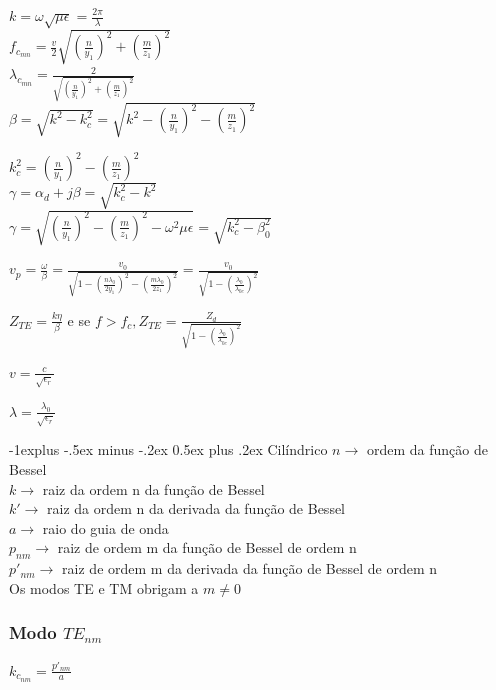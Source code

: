 \documentclass[10pt,landscape]{article}
\makeatletter
\renewcommand{\subsection}{\@startsection{subsection}{2}{0mm}%
                                {-1explus -.5ex minus -.2ex}%
                                {0.5ex plus .2ex}%
                                {\normalfont\normalsize\bfseries}}
\makeatother
\begin{document}
\begin{multicols}{4}
$k = \omega \sqrt{\mu\epsilon} = \frac{2 \pi}{\lambda}$ \\
$f_{c_{mn}} = \frac{v}{2} \sqrt{\left(\frac{n}{y_1}\right)^2 + \left(\frac{m}{z_1}\right)^2}$ \\
$\lambda_{c_{mn}} = \frac{2}{\sqrt{\left(\frac{n}{y_1}\right)^2 + \left(\frac{m}{z_1}\right)^2}}$ \\

$\beta = \sqrt{k^2 - k_c^2} = \sqrt{k^2 - \left(\frac{n}{y_1}\right)^2 - \left(\frac{m}{z_1}\right)^2}$ 

$k_c^2 = \left(\frac{n}{y_1}\right)^2 - \left(\frac{m}{z_1}\right)^2$\\

$\gamma = \alpha_d + j\beta = \sqrt{k_c^2 - k^2}$ \\

$\gamma = \sqrt{\left(\frac{n}{y_1}\right)^2 - \left(\frac{m}{z_1}\right)^2 - \omega^2\mu\epsilon} = \sqrt{k_c^2 - \beta_0^2}$ 

$v_p = \frac{\omega}{\beta} = \frac{v_0}{\sqrt{1 - \left(\frac{n\lambda_0}{2y_1}\right)^2 - \left(\frac{m\lambda_0}{2z_1}\right)^2 }} = \frac{v_0}{\sqrt{1 - \left(\frac{\lambda_0}{\lambda_{0c}}\right)^2}}$ 

$Z_{TE} = \frac{k\eta}{\beta}$ 
e se $f > f_c, Z_{TE} = \frac{Z_d}{\sqrt{1 - \left(\frac{\lambda_0}{\lambda_{0c}}\right)^2}} $

$v = \frac{c}{\sqrt{\epsilon_r}}$

$\lambda = \frac{\lambda_0}{\sqrt{\epsilon_r}}$

\subsection{Cilíndrico}
$n \rightarrow$ ordem da função de Bessel \\
$k \rightarrow$ raiz da ordem n da função de Bessel \\
$k' \rightarrow$ raiz da ordem n da derivada da função de Bessel \\
$a  \rightarrow$ raio do guia de onda \\
$p_{nm} \rightarrow$ raiz de ordem m da função de Bessel de ordem n \\
$p'_{nm} \rightarrow$ raiz de ordem m da derivada da função de Bessel de ordem n \\

Os modos TE e TM obrigam a $m \neq 0$

\subsubsection{Modo $TE_{nm}$}
$k_{c_{nm}} = \frac{p'_{nm}}{a}$ \\


\end{multicols}
\end{document}
